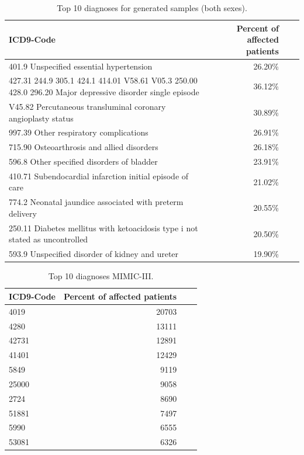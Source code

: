 \documentclass[11pt, a4paper]{book}
\begin{document}
\begin{table}
\begin{tabularx}{\textwidth}{p{}|r|X|r}
\textbf{ICD9-Code} & \textbf{Percent of affected patients}\\
\hline
401.9 Unspecified essential hypertension & 26.20\%\\
427.31
244.9
305.1
424.1
414.01
V58.61
V05.3
250.00
428.0
296.20 Major depressive disorder single episode & 36.12\%\\
V45.82 Percutaneous transluminal coronary angioplasty status & 30.89\%\\
997.39 Other respiratory complications & 26.91\%\\
715.90 Osteoarthrosis and allied disorders & 26.18\%\\
596.8 Other specified disorders of bladder & 23.91\%\\
410.71 Subendocardial infarction initial episode of care & 21.02\%\\
774.2 Neonatal jaundice associated with preterm delivery & 20.55\%\\
250.11 Diabetes mellitus with ketoacidosis type i not stated as uncontrolled & 20.50\%\\
593.9 Unspecified disorder of kidney and ureter & 19.90\%\\
\end{tabularx}
\caption{\label{tab:top10-icd-mixed}Top 10 diagnoses for generated samples (both sexes).}
\end{table}

\begin{table}
\begin{tabularx}{\textwidth}{p{}|r|X|r}
\textbf{ICD9-Code} & \textbf{Percent of affected patients}\\
\hline
4019 & 20703\\
4280   & 13111\\
42731    & 12891\\
41401    & 12429\\
5849      & 9119\\
25000     & 9058\\
2724     & 8690\\
51881    & 7497\\
5990     & 6555\\
53081    & 6326\\
\end{tabularx}
\caption{\label{tab:top10-icd-mimic}Top 10 diagnoses MIMIC-III.}
\end{table}
\end{document}
